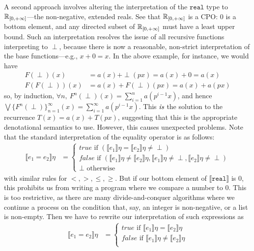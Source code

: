 A second approach involves altering the interpretation of the $\texttt{real}$ type to 
$\mathbb{R}_{[0,+\infty]}$---the non-negative, extended reals. See that $\mathbb{R}_{[0,+\infty]}$ is a CPO: $0$ is a bottom element,
and any directed subset of $\mathbb{R}_{[0,+\infty]}$ must have a least upper bound. Such an interpretation
resolves the issue of all recursive functions interpreting to $\perp$, because there is now a reasonable, non-strict
interpretation of the base functions---e.g., $x + 0 = x$. In the above example, for instance, we would have
\begin{align*}
F(\perp)(x) &= a(x) + \perp(px) = a(x) + 0 = a(x) \\
F(F(\perp))(x) &= a(x) + F(\perp)(px) = a(x) + a(px)
\end{align*}
so, by induction, 
$\forall n, \ F^n(\perp)(x) = \sum_{i=1}^{n}a(p^{i-1}x)$, and hence $\bigvee\{F^n(\perp)\}^{\infty}_{n=1}(x) = \sum_{i=1}
^{\infty}a(p^{i-1}x)$. This $\emph{is}$ the solution to the recurrence $T(x) = a(x) + T(px)$, suggesting that this is the 
appropriate denotational semantics to use. However, this causes unexpected problems. Note that
 the standard interpretation of the equality operator is as follows:
\begin{align*}
 \llbracket e_1 = e_2 \rrbracket\eta &= 
 \begin{cases} 
      true \text{ if } (\llbracket e_1 \rrbracket\eta = \llbracket e_2 \rrbracket\eta \neq \perp) \\
      false \text{  if } (\llbracket e_1 \rrbracket\eta \neq \llbracket e_2\rrbracket\eta, \llbracket e_1 \rrbracket\eta \neq \perp, \llbracket e_2 \rrbracket\eta \neq \perp)\\
      \perp \text{ otherwise}
   \end{cases} 
\end{align*}
with similar rules for $<, >, \leq, \geq$. But if our bottom element of $\llbracket \texttt{real} \rrbracket$ is $0$, this 
prohibits us from writing a program where we compare a number to $0$. This is too restrictive, as there are many 
divide-and-conquer algorithms where we continue a process on the condition that, say, an integer is non-negative, or a 
list is non-empty. Then we have to rewrite our interpretation of such expressions as
\begin{align*}
 \llbracket e_1 = e_2 \rrbracket\eta &= 
 \begin{cases} 
      true \text{ if } \llbracket e_1 \rrbracket\eta = \llbracket e_2 \rrbracket\eta \\
      false \text{  if } \llbracket e_1 \rrbracket\eta \neq \llbracket e_2\rrbracket\eta\\
   \end{cases} 
\end{align*}

